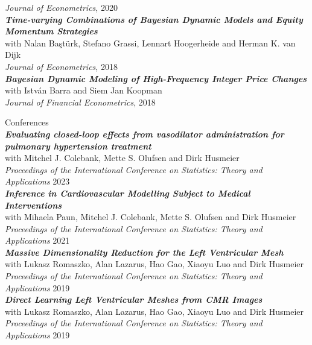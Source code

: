 	\textit{Journal of Econometrics}, 2020\vspace{2mm}\\ 
\textit{\textbf{Time-varying Combinations of Bayesian Dynamic Models and Equity Momentum Strategies}}\\
	with Nalan Ba\c{s}t\"{u}rk, Stefano Grassi, Lennart Hoogerheide and Herman K. van Dijk\\
	\textit{Journal of Econometrics}, 2018 \vspace{2mm} \\
\textit{\textbf{Bayesian Dynamic Modeling of High-Frequency Integer Price Changes}}\\
	with Istv\'{a}n Barra  and Siem Jan Koopman\\
	\textit{Journal of Financial Econometrics}, 2018\\ 
\vspace{-5mm}

{\mysidestyle Conferences}  \vspace{1mm}\\	
\textit{\textbf{Evaluating closed-loop effects from vasodilator administration for pulmonary hypertension treatment}}\\
	with Mitchel J. Colebank,  Mette S. Olufsen and Dirk Husmeier\\
	\textit{Proceedings of the International Conference on Statistics: Theory and Applications} 2023  \vspace{2mm}\\
\textit{\textbf{Inference in Cardiovascular Modelling Subject to Medical Interventions}}\\
	with Mihaela Paun, Mitchel J. Colebank, Mette S. Olufsen and Dirk Husmeier\\
	\textit{Proceedings of the International Conference on Statistics: Theory and Applications} 2021  \vspace{2mm}\\
\textit{\textbf{Massive Dimensionality Reduction for the Left Ventricular Mesh}}\\
	with Lukasz Romaszko, Alan Lazarus, Hao Gao, Xiaoyu Luo and Dirk Husmeier\\
	\textit{Proceedings of the International Conference on Statistics: Theory and Applications} 2019  \vspace{2mm}\\
\textit{\textbf{Direct Learning Left Ventricular Meshes from CMR Images}}\\
	with Lukasz Romaszko, Alan Lazarus, Hao Gao, Xiaoyu Luo and Dirk Husmeier\\
	\textit{Proceedings of the International Conference on Statistics: Theory and Applications} 2019 \vspace{1mm} \\
